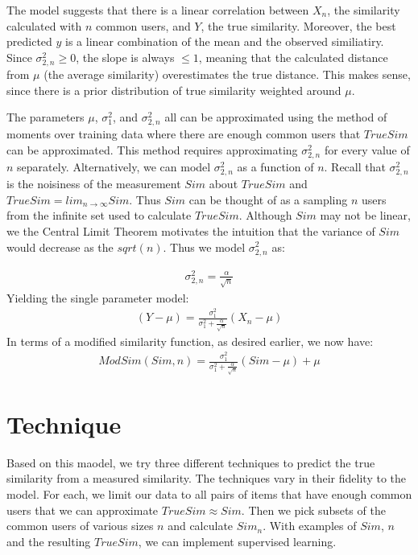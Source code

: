 \documentclass[10pt]{article}
\begin{document}
The model suggests that there is a linear correlation between $X_n$, the
similarity calculated with $n$ common users, and $Y$, the true similarity.
Moreover, the best predicted $y$ is a linear combination of the mean and the
observed similiatiry. Since $\sigma_{2,n}^2\ge0$, the slope is always $\le1$, 
meaning that the calculated distance from $\mu$ (the average similarity) 
overestimates the true distance. This makes sense, since there is a prior 
distribution of true similarity weighted around $\mu$.

The parameters $\mu$, $\sigma_{1}^2$, and $\sigma_{2,n}^2$ all can be approximated 
using the method of moments over training data where there are enough common
users that $TrueSim$ can be approximated. This method requires approximating
$\sigma_{2,n}^2$ for every value of $n$ separately. Alternatively, we can model
$\sigma_{2,n}^2$ as a function of $n$. Recall that $\sigma_{2,n}^2$ is the
noisiness of the measurement $Sim$ about $TrueSim$ and $TrueSim = lim_{n \to
\infty}Sim$. Thus $Sim$ can be thought of as a sampling $n$ users from the
infinite set used to calculate $TrueSim$. Although $Sim$ may not be linear, we
the Central Limit Theorem motivates the intuition that the variance of $Sim$
would decrease as the $sqrt(n)$. Thus we model $\sigma_{2,n}^2$ as:

\begin{align}
\sigma_{2,n}^2 = \frac{\alpha}{\sqrt{n}}
\end{align}
Yielding the single parameter model:
\begin{align}
\left(Y - \mu\right) = \frac{\sigma_{1}^2}{\sigma_{1}^2+\frac{\alpha}{\sqrt{n}}}
\left(X_n-\mu\right)
\end{align}
In terms of a modified similarity function, as desired earlier, we now have:
\begin{align}
ModSim(Sim, n) = \frac{\sigma_{1}^2}{\sigma_{1}^2+\frac{\alpha}{\sqrt{n}}}
\left(Sim-\mu\right) + \mu
\end{align}

\section*{Technique}
Based on this maodel, we try three different techniques to predict the true similarity from a
measured similarity. The techniques vary in their fidelity to the model. For
each, we limit our data to all pairs of items that have enough common users that
we can approximate $TrueSim \approx Sim$. Then we pick subsets of the common
users of various sizes $n$ and calculate $Sim_{n}$. With examples of $Sim$, $n$
and the resulting $TrueSim$, we can implement supervised learning.
\end{document}
